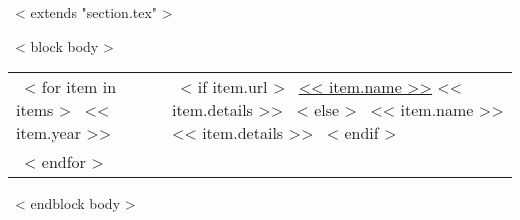 ~< extends "section.tex" >~

~< block body >~
\begin{tabular}{p{0.5in}p{5in}}
  ~< for item in items >~
    << item.year >> &
    ~< if item.url >~
      \href{<< item.url >>}{<< item.name >>} << item.details >>
    ~< else >~
      << item.name >> << item.details >>
    ~< endif >~ \\
  ~< endfor >~
\end{tabular}
~< endblock body >~
